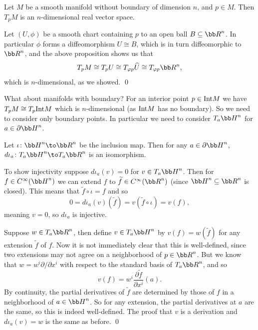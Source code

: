 \eproof

\bprop

    Let $M$ be a smooth manifold without boundary of dimension $n$, and $p\in M$.
    Then $T_pM$ is an $n$-dimensional real vector space.

\eprop

\bproof

    Let $(U,\phi)$ be a smooth chart containing $p$ to an open ball $B\subseteq\bR^n$.
    In particular $\phi$ forms a diffeomorphism $U\cong B$, which is in turn diffeomorphic to $\bR^n$, and the above proposition shows us that
    $$ T_pM \cong T_pU \cong T_{\phi p}\hat U \cong T_{\phi p}\bR^n , $$
    which is $n$-dimensional, as we showed.
    \qed

\eproof

What about manifolds with boundary?
For an interior point $p\in{\rm Int} M$ we have $T_pM\cong T_p{\rm Int} M$ which is $n$-dimensional (as ${\rm Int} M$ has no boundary).
So we need to consider only boundary points.
In particular we need to consider $T_a\bH^n$ for $a\in\partial\bH^n$.

\blemm

    Let $\iota\colon\bH^n\to\bR^n$ be the inclusion map.
    Then for any $a\in\partial\bH^n$, $d\iota_a\colon T_a\bH^n\to T_a\bR^n$ is an isomorphism.

\elemm

\bproof

    To show injectivity suppose $d\iota_a(v)=0$ for $v\in T_a\bH^n$.
    Then for $f\in C^\infty(\bH^n)$ we can extend $f$ to $\tilde f\in C^\infty(\bR^n)$ (since $\bH^n\subseteq\bR^n$ is closed).
    This means that $\tilde f\circ\iota=f$ and so
    $$ 0 = d\iota_a(v)(\tilde f) = v(\tilde f\circ\iota) = v(f) , $$
    meaning $v=0$, so $d\iota_a$ is injective.

    Suppose $w\in T_a\bR^n$, then define $v\in T_a\bH^n$ by $v(f)=w(\tilde f)$ for any extension $\tilde f$ of $f$.
    Now it is not immediately clear that this is well-defined, since two extensions may not agree on a neighborhood of $p\in\bR^n$.
    But we know that $w=w^i\partial/\partial x^i$ with respect to the standard basis of $T_a\bR^n$, and so
    $$ v(f) = w^i\frac{\partial\tilde f}{\partial x^i}(a) . $$
    By continuity, the partial derivatives of $\tilde f$ are determined by those of $f$ in a neighborhood of $a\in\bH^n$.
    So for any extension, the partial derivatives at $a$ are the same, so this is indeed well-defined.
    The proof that $v$ is a derivation and $d\iota_a(v)=w$ is the same as before.
    \qed

